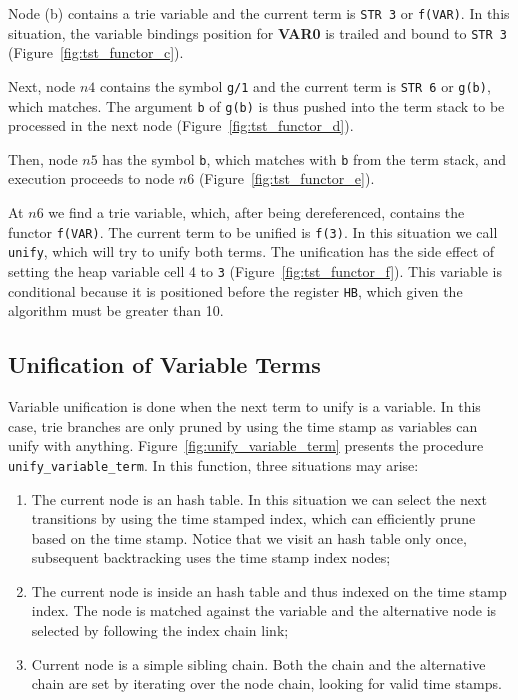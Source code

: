 Node (b) contains a trie variable and the current term is \texttt{STR 3} or \texttt{f(VAR)}.
In this situation, the variable bindings position for \textbf{VAR0} is trailed and bound to \texttt{STR 3}
(Figure~\ref{fig:tst_functor_c}).

Next, node $n4$ contains the symbol \texttt{g/1} and the current term is \texttt{STR 6}
or \texttt{g(b)}, which matches. The argument \texttt{b} of \texttt{g(b)}
is thus pushed into the term stack to be processed in the next node (Figure~\ref{fig:tst_functor_d}).

Then, node $n5$ has the symbol \texttt{b}, which matches with \texttt{b} from the term stack, and
execution proceeds to node $n6$ (Figure~\ref{fig:tst_functor_e}).

At $n6$ we find a trie variable, which, after being dereferenced, contains the
functor \texttt{f(VAR)}. The current term to be unified is \texttt{f(3)}.
In this situation we call \texttt{unify}, which will try to unify both terms.
The unification has the side effect of setting the heap variable cell 4 to \texttt{3}
(Figure~\ref{fig:tst_functor_f}).
This variable is conditional because it is positioned before the register \texttt{HB},
which given the algorithm must be greater than 10.

\subsection{Unification of Variable Terms}

Variable unification is done when the next term to unify is a variable. In this case, trie branches are only pruned
by using the time stamp as variables can unify with anything.
Figure~\ref{fig:unify_variable_term} presents the procedure \texttt{unify\_variable\_term}. In this function, three
situations may arise:

\begin{enumerate}
  \item The current node is an hash table. In this situation we can select the next transitions
   by using the time stamped index, which can efficiently prune based on the time stamp. Notice that we visit
   an hash table only once, subsequent backtracking uses the time stamp index nodes;
  \item The current node is inside an hash table and thus indexed on the time stamp index.
   The node is matched against the variable and the alternative node is selected by following
   the index chain link;
  \item Current node is a simple sibling chain. Both the chain and the alternative chain are set by
   iterating over the node chain, looking for valid time stamps.
\end{enumerate}

